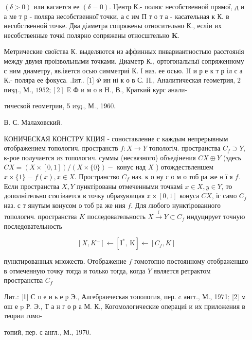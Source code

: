 \documentclass[10pt]{article}
\begin{document}
$(\delta>0)$ или касается ее $(\delta=0)$. Центр К.- полюс несобственной прямої, д и а ме т р - поляра несобственної̈ точки, а с им П т о т а - касательная к К. в несобственной точке. Два діаметра сопряжены относительно К., есліи их несобственные точкі полярно сопряжены относштельно $\mathbf{K}$.



Метрические своїства К. выделяются из аффинных пнвариантностыю расстоянія между двумя проізвольными точками. Диаметр К., ортогональныї сопряженному с ним диаметру, яв.іяется осью симметриі К. І наз. ее осью. II и р е к т р іл с а К.- поляра ее фокуса. .Іит.. [1] $\Phi$ ин ні к о в С. П., Аналитическая геометрия, 2 пизд., М., $1952 ;[2]$ Е Ф и м о в Н., В., Краткий курс анали-

тической геометрии, 5 изд., М., 1960.

В. С. Малаховский.



КОНИЧЕСКАЯ КОНСТРУ КЦИЯ - соноставление с каждым непрерывным отображением топологич. пространств $f: X \rightarrow Y$ топологіч. пространства $C_{f} \supset Y$, к-рое получается из топологич. суммы (несвязного) объедінения $C X \oplus Y$ (здесь $C X=(X \times[0,1]) /(X \times\{0\})-$ конус над $X$ ) отождествленшем $x \times\{1\}=f(x), x \in X$. Пространство $C_{f}$ наз. к о ну с о м о тоб ра же н ї я $f$. Если пространства $X, Y$ пунктірованы отмеченными точкамі $x \in X, y \in Y$, то дополнітельно стягівается в точку образуюицая $x \times[0,1]$ конуса $C X$, іг само $C_{f}$ наз. с т янутым конусом о тоб ра же ния $f$. Для любого нунктірованного топологич. пространства $K$ последовательность $X \stackrel{i}{\rightarrow} Y \subset C_{f}$ индуцирует точную последовательность



\[

\left[X, K^{-}\right] \leftarrow\left[\mathrm{I}^{*}, \mathrm{~K}\right] \leftarrow\left[C_{f}, K\right]

\]



пунктированных множеств. Отображение $f$ гомотопно постоянному отображеншю в отмеченную точку тогда и только тогда, когда $Y$ является ретрактом пространства $C_{f}$



Лит.: [1] С п е и ь е р Э., Алгебраическая топология, пер. c ангт., М., 1971; [2] м ош е p Р. Э., Т а н г о р а М. К., Когомологические операциі и их приложения в теории гомо-

топий, пер. с англ., М., 1970.
\end{document}

